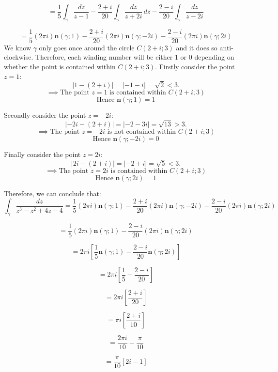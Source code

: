\documentclass[12pt]{article}
\begin{document}
\begin{enumerate}[label=\textbf{(\roman*)}]
\[
= \frac{1}{5}\int_{\gamma} \frac{dz}{z-1} - \frac{2+i}{20} \int_{\gamma} \frac{dz}{z+2i}\, dz - \frac{2-i}{20} \int_{\gamma} \frac{dz}{z-2i}
\]

\[
= \frac{1}{5}\left(2\pi i\right) \mathbf{n}\left(\gamma;1\right) - \frac{2+i}{20} \left(2\pi i\right) \mathbf{n}\left(\gamma;-2i\right)- \frac{2-i}{20} \left(2\pi i\right)\mathbf{n}\left(\gamma;2i\right)
\]
\noindent We know \(\gamma\) only goes once around the circle \(C(2+i;3)\) and it does so anti-clockwise. Therefore, each winding number will be either \(1\) or \(0\) depending on whether the point is contained within \(C(2+i;3)\).\newline
\linebreak
Firstly consider the point \(z=1\):
\[
    \left| 1 - \left(2+i\right) \right| = \left| - 1 - i \right| = \sqrt{2} < 3.
\]
\[
    \implies \text{The point } z = 1 \text{ is contained within } C(2+i;3)
\]
\[
\text{Hence } \mathbf{n}\left(\gamma;1\right) = 1
\]

Secondly consider the point \(z=-2i\):
\[
    \left| -2i - \left(2+i\right) \right| = \left| - 2 - 3i \right| = \sqrt{13} > 3.
\]
\[
    \implies \text{The point } z = -2i \text{ is not contained within } C(2+i;3)
\]
\[
    \text{Hence } \mathbf{n}\left(\gamma;-2i\right) = 0
\]

Finally consider the point \(z=2i\):
\[
    \left| 2i - \left(2+i\right) \right| = \left| - 2 + i \right| = \sqrt{5} < 3.
\]
\[
    \implies \text{The point } z = 2i \text{ is contained within } C(2+i;3)
\]
\[
    \text{Hence } \mathbf{n}\left(\gamma;2i\right) = 1
\]

Therefore, we can conclude that:
\[
\int_{\gamma} \frac{dz}{z^3 - z^2 + 4z - 4} = \frac{1}{5}\left(2\pi i\right) \mathbf{n}\left(\gamma;1\right) - \frac{2+i}{20} \left(2\pi i\right) \mathbf{n}\left(\gamma;-2i\right)- \frac{2-i}{20} \left(2\pi i\right)\mathbf{n}\left(\gamma;2i\right)
\]

\[
    = \frac{1}{5}\left(2\pi i\right) \mathbf{n}\left(\gamma;1\right) - \frac{2-i}{20} \left(2\pi i\right)\mathbf{n}\left(\gamma;2i\right)
\]

\[
=2\pi i\left[\frac{1}{5} \mathbf{n}\left(\gamma;1\right) - \frac{2-i}{20} \mathbf{n}\left(\gamma;2i\right)\right]
\]

\[
=2\pi i\left[\frac{1}{5} - \frac{2-i}{20}\right]
\]

\[
= 
2\pi i\left[\frac{2+i}{20}\right] 
\]

\[
= 
\pi i\left[\frac{2+i}{10}\right] 
\]

\[
= 
\frac{2\pi i}{10} - \frac{\pi}{10}
\]

\[
= \frac{\pi}{10} \left[2i - 1\right]
\]

\end{enumerate}    
\hrulefill
\end{document}
